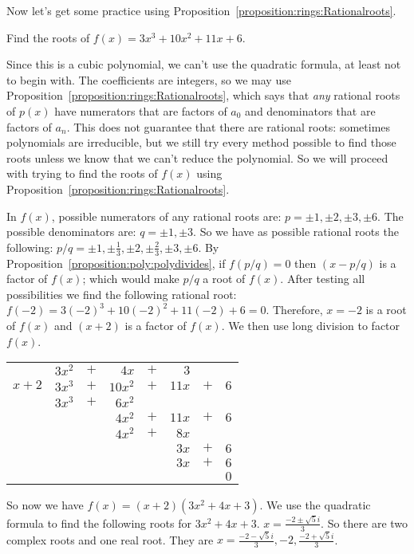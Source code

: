 Now let's get some practice using Proposition~\ref{proposition:rings:Rationalroots}.

\begin{example}
Find the roots of $f(x)=3x^3+10x^2+11x+6$.

Since this is a cubic polynomial, we can't use the quadratic formula, at least not to begin with. The coefficients are integers, so we may use Proposition~\ref{proposition:rings:Rationalroots}, which says that \emph{any} rational roots of $p(x)$ have numerators that are factors of $a_{0}$ and denominators that  are factors of $a_{n}$. This does not guarantee that there are rational roots: sometimes polynomials are irreducible, but we still try every method possible to find those roots unless we know that we can't reduce the polynomial. So we will proceed with trying to find the roots of $f(x)$ using Proposition~\ref{proposition:rings:Rationalroots}.

In $f(x)$, possible numerators of any rational roots are: $p=\pm1, \pm2, \pm3, \pm6$. The possible denominators are: $q=\pm1, \pm3$.
So we have as possible rational roots the following: $p/q= \pm1, \pm\frac{1}{3}, \pm2, \pm\frac{2}{3},\pm3, \pm6$.
By Proposition~\ref{proposition:poly:polydivides}, if $f(p/q)=0$ then $(x-p/q)$ is a factor of $f(x)$; which would make $p/q$ a root of $f(x)$. After testing all possibilities we find the following rational root:
$f(-2)=3(-2)^3+10(-2)^2+11(-2)+6=0$. Therefore, $x=-2$ is a root of $f(x)$ and $(x+2)$ is a factor of $f(x)$.
We then use long division to factor $f(x)$.

\begin{center}
\begin{tabular}{rrcrcrcr}
        &  $3x^2$  &  $+$  &      $4x$  &  $+$  &    $3$  &       &       \\ \cline{2-8}
 \multicolumn{1}{r|}{$x + 2$}
        &  $3x^3$  &  $+$  &    $10x^2$  &  $+$  & $ 11x$  &  $+$  &  $6$  \\
        &  $3x^3$  &  $+$  &    $6 x^2$  &       &         &       &       \\ \cline{2-8}
        &         &       &                $4x^2$  & $+$  &  $ 11x$  &  $+$  &  $6$  \\
        &         &       &                $4x^2$  &  $+$  & $ 8x$  &       &       \\ \cline{4-8}
        &         &       &           &       &                         $3 x$  & $+$  & $6$  \\
        &         &       &           &       &                          $3x$  & $+$  & $6$  \\ \cline{6-8}
        &         &       &           &       &         &       &                               $0$
\end{tabular}
\end{center}
So now we have $f(x)=(x+2)(3x^2+4x+3)$. We use the quadratic formula to find the following roots for $3x^2+4x+3$.
$x=\frac{-2\pm \sqrt{5}i}{3}$.
So there are two complex roots and one real root. They are $x={\frac{-2 - \sqrt{5}i}{3}, -2, \frac{-2+ \sqrt{5}i}{3}}$.
\end{example}

